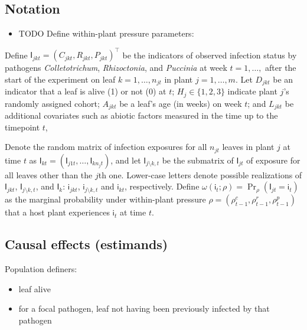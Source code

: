 \documentclass[]{article}
\providecommand{\tightlist}{%
  \setlength{\itemsep}{0pt}\setlength{\parskip}{0pt}}
\begin{document}
\hypertarget{notation}{%
\subsection{Notation}\label{notation}}

\begin{itemize}
\tightlist
\item
  TODO Define within-plant pressure parameters:
\end{itemize}

Define \(\mathsf{I}_{jkt} = (C_{jkt}, R_{jkt}, P_{jkt})^\intercal\) be
the indicators of observed infection status by pathogens
\emph{Colletotrichum}, \emph{Rhizoctonia}, and \emph{Puccinia} at week
\(t = 1, \dots,\) after the start of the experiment on leaf
\(k = 1, \dots, n_{jt}\) in plant \(j = 1, \dots, m\). Let \(D_{jkt}\)
be an indicator that a leaf is alive (1) or not (0) at \(t\);
\(H_{j} \in \{1, 2, 3\}\) indicate plant \(j\)'s randomly assigned
cohort; \(A_{jkt}\) be a leaf's age (in weeks) on week \(t\); and
\(L_{jkt}\) be additional covariates such as abiotic factors measured in
the time up to the timepoint \(t\),

Denote the random matrix of infection exposures for all \(n_{jt}\)
leaves in plant \(j\) at time \(t\) as
\(\mathsf{I}_{kt} = (\mathsf{I}_{j1t} , \dots, \mathsf{I}_{kn_jt})\),
and let \(\mathsf{I}_{j \setminus k, t}\) be the submatrix of
\(\mathsf{I}_{jt}\) of exposure for all leaves other than the \(j\)th
one. Lower-case letters denote possible realizations of
\(\mathsf{I}_{jkt}\), \(\mathsf{I}_{j \setminus k, t}\), and
\(\mathsf{I}_{k}\): \(\mathsf{i}_{jkt}\),
\(\mathsf{i}_{j \setminus k, t}\) and \(\mathsf{i}_{kt}\), respectively.
Define
\(\omega(\mathsf{i}_{t}; \rho) = \Pr_{\rho}(\mathsf{I}_{jt} = \mathsf{i}_{t})\)
as the marginal probability under within-plant pressure
\(\rho = (\rho^c_{t-1}, \rho^r_{t-1}, \rho^p_{t-1})\) that a host plant
experiences \(\mathsf{i}_t\) at time \(t\).

\hypertarget{causal-effects-estimands}{%
\subsection{Causal effects (estimands)}\label{causal-effects-estimands}}

Population definers:

\begin{itemize}
\tightlist
\item
  leaf alive
\item
  for a focal pathogen, leaf not having been previously infected by that
  pathogen
\end{itemize}
\end{document}
